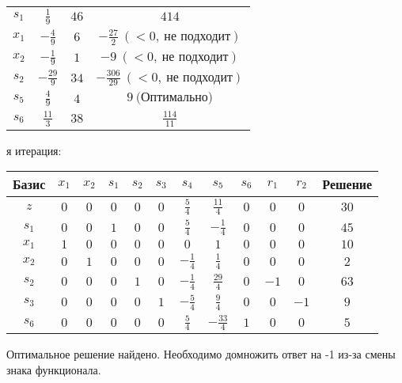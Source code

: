 \documentclass{article}%
\begin{document}
\begin{flushleft}
\begin{tabular}{|cccc|}
\hline%
$s_{1}$&$\frac{1}{9}$&$46$&$414$\\%
$x_{1}$&$-\frac{4}{9}$&$6$&$-\frac{27}{2}\: (< 0, \: \text{не подходит})$\\%
$x_{2}$&$-\frac{1}{9}$&$1$&$-9\: (< 0, \: \text{не подходит})$\\%
$s_{2}$&$-\frac{29}{9}$&$34$&$-\frac{306}{29}\: (< 0, \: \text{не подходит})$\\%
$s_{5}$&$\frac{4}{9}$&$4$&$9\: \text{(Оптимально)}$\\%
$s_{6}$&$\frac{11}{3}$&$38$&$\frac{114}{11}$\\%
\hline%
\end{tabular}%
\newline%
\newline%
я итерация: %
\newline%
\newline%
\renewcommand{\arraystretch}{1.3}%
\begin{tabular}{|c|cccccccccc|c|}%
\hline%
Базис&$x_{1}$&$x_{2}$&$s_{1}$&$s_{2}$&$s_{3}$&$s_{4}$&$s_{5}$&$s_{6}$&$r_{1}$&$r_{2}$&Решение\\%
\hline%
$z$&$0$&$0$&$0$&$0$&$0$&$\frac{5}{4}$&$\frac{11}{4}$&$0$&$0$&$0$&$30$\\%
\hline%
$s_{1}$&$0$&$0$&$1$&$0$&$0$&$\frac{5}{4}$&$-\frac{1}{4}$&$0$&$0$&$0$&$45$\\%
$x_{1}$&$1$&$0$&$0$&$0$&$0$&$0$&$1$&$0$&$0$&$0$&$10$\\%
$x_{2}$&$0$&$1$&$0$&$0$&$0$&$-\frac{1}{4}$&$\frac{1}{4}$&$0$&$0$&$0$&$2$\\%
$s_{2}$&$0$&$0$&$0$&$1$&$0$&$-\frac{1}{4}$&$\frac{29}{4}$&$0$&$-1$&$0$&$63$\\%
$s_{3}$&$0$&$0$&$0$&$0$&$1$&$-\frac{5}{4}$&$\frac{9}{4}$&$0$&$0$&$-1$&$9$\\%
$s_{6}$&$0$&$0$&$0$&$0$&$0$&$\frac{5}{4}$&$-\frac{33}{4}$&$1$&$0$&$0$&$5$\\%
\hline%
\end{tabular}%
\newline%
\end{flushleft}%
Оптимальное решение найдено. Необходимо домножить ответ на {-}1 из{-}за смены знака функционала.%
\newline%
\end{document}
